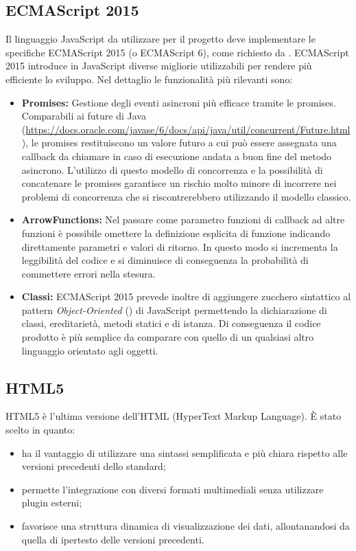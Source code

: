 \subsection{ECMAScript 2015}
Il linguaggio JavaScript da utilizzare per il progetto deve implementare le specifiche ECMAScript 2015 (o ECMAScript 6), come richiesto da \glossario{\Proponente}. ECMAScript 2015 introduce in JavaScript diverse migliorie utilizzabili per rendere più efficiente lo sviluppo. Nel dettaglio le funzionalità più rilevanti sono:
\begin{itemize}
	\item \textbf{Promises:} Gestione degli eventi asincroni più efficace tramite le promises. Comparabili ai future di Java (\url{https://docs.oracle.com/javase/6/docs/api/java/util/concurrent/Future.html}), le promises restituiscono un valore futuro a cui può essere assegnata una callback da chiamare in caso di esecuzione andata a buon fine del metodo asincrono. L'utilizzo di questo modello di concorrenza e la possibilità di concatenare le promises garantisce un rischio molto minore di incorrere nei problemi di concorrenza che si riscontrerebbero utilizzando il modello classico.
	\item \textbf{ArrowFunctions:} Nel passare come parametro funzioni di callback ad altre funzioni è possibile omettere la definizione esplicita di funzione indicando direttamente parametri e valori di ritorno. In questo modo si incrementa la leggibilità del codice e si diminuisce di conseguenza la probabilità di commettere errori nella stesura.
	\item \textbf{Classi:} ECMAScript 2015 prevede inoltre di aggiungere zucchero sintattico al pattern \textit{Object-Oriented} () di JavaScript permettendo la dichiarazione di classi, ereditarietà, metodi statici e di istanza. Di conseguenza il codice prodotto è più semplice da comparare con quello di un qualsiasi altro linguaggio orientato agli oggetti.
\end{itemize}

\subsection{HTML5}
HTML5 è l'ultima versione dell'HTML (HyperText Markup Language). È stato scelto in quanto:
\begin{itemize}
	\item ha il vantaggio di utilizzare una sintassi semplificata e più chiara rispetto alle versioni precedenti dello standard;
	\item permette l'integrazione con diversi formati multimediali senza utilizzare plugin esterni; 
	\item favorisce una struttura dinamica di visualizzazione dei dati, allontanandosi da quella di ipertesto delle versioni precedenti.
\end{itemize}

